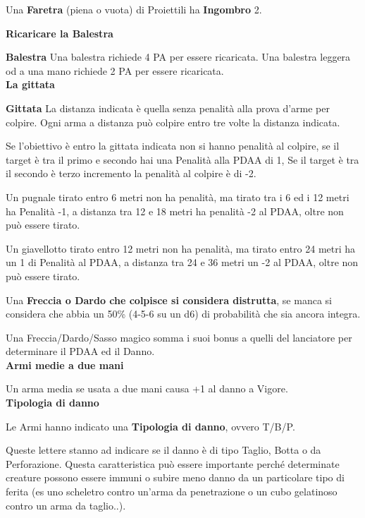 \documentclass[12pt,a4paper,twoside,openany]{book}
\begin{document}
\medskip

Una \textbf{Faretra} (piena o vuota) di Proiettili ha \textbf{Ingombro} 2.\\

\pagebreak

\begin{multicols}{2}
	
\textbf{Ricaricare la Balestra}	
	
\textbf{Balestra}
Una balestra richiede 4 PA per essere ricaricata. Una balestra leggera od a una mano richiede 2 PA per essere ricaricata.\\

\textbf{La gittata}

\textbf{Gittata}
La distanza indicata è quella senza penalità alla prova d'arme per colpire. Ogni arma a distanza può colpire entro tre volte la distanza indicata.

Se l'obiettivo è entro la gittata indicata non si hanno penalità al colpire, se il target è tra il primo e secondo hai una Penalità alla PDAA di 1, Se il target è tra il secondo è terzo incremento la penalità al colpire è di -2.

Un pugnale tirato entro 6 metri non ha penalità, ma tirato tra i 6 ed i 12 metri ha Penalità -1, a distanza tra 12 e 18 metri ha penalità -2 al PDAA, oltre non può essere tirato.

Un giavellotto tirato entro 12 metri non ha penalità, ma tirato entro 24 metri ha un 1 di Penalità al PDAA, a distanza tra 24 e 36 metri un -2 al PDAA, oltre non può essere tirato.

Una \textbf{Freccia o Dardo che colpisce si considera distrutta}, se manca si considera che abbia un 50\% (4-5-6 su un d6) di probabilità che sia ancora integra.

Una Freccia/Dardo/Sasso magico somma i suoi bonus a quelli del lanciatore per determinare il PDAA ed il Danno.\\

\textbf{Armi medie a due mani}

Un arma media se usata a due mani causa +1 al danno a Vigore.\\

\textbf{Tipologia di danno}

Le Armi hanno indicato una \textbf{Tipologia di danno}, ovvero T/B/P.

Queste lettere stanno ad indicare se il danno è di tipo Taglio, Botta o da Perforazione. Questa caratteristica può essere importante perché determinate creature possono essere immuni o subire meno danno da un particolare tipo di ferita (es uno scheletro contro un'arma da penetrazione o un cubo gelatinoso contro un arma da taglio..).


\end{multicols}
\end{document}
